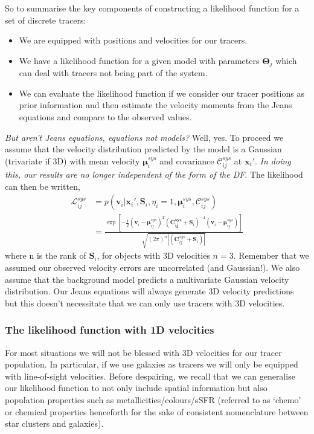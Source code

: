 So to summarise the key components of constructing a likelihood function for a set of discrete tracers: 
\begin{itemize}
    \item We are equipped with positions and velocities for our tracers.
    \item We have a likelihood function for a given model with parameters $\boldsymbol{\Theta}_{j}$ which can deal with tracers not being part of the system.
    \item We can evaluate the likelihood function if we consider our tracer positions as prior information and then estimate the velocity moments from the Jeans equations and compare to the observed values.
\end{itemize}
\textit{But aren't Jeans equations, equations not models?} Well, yes. To proceed we assume that the velocity distribution predicted by the model is a Gaussian (trivariate if 3D)  with mean velocity $\boldsymbol{\mu}_{i}^{sys}$ and covariance $\boldsymbol{\mathcal{C}}_{ij}^{sys}$ at $\boldsymbol{x}_i'$. \textit{In doing this, our results are no longer independent of the form of the DF}. The likelihood can then be written, 
\begin{align*}
\mathcal{L}_{ij}^{sys} &= p(\boldsymbol{v}_i|\boldsymbol{x}_{i}',\boldsymbol{S}_i,\eta_i=1,\boldsymbol{\mu}_{i}^{sys},\boldsymbol{\mathcal{C}}_{ij}^{sys}) \\ &= \frac{\exp{\left[-\frac{1}{2}(\boldsymbol{v}_i - \boldsymbol{\mu}_{ij}^{sys})^{T}(\boldsymbol{C_{ij}^{sys}} + \boldsymbol{S}_i)^{-1}(\boldsymbol{v}_i - \boldsymbol{\mu}_{ij}^{sys}) \right]}}{\sqrt{(2\pi)^{n}|(\boldsymbol{C}_{ij}^{sys}+\boldsymbol{S}_i)|}}
\end{align*}
where n is the rank of $\boldsymbol{S}_i$, for objects with 3D velocities $n=3$. Remember that we assumed our observed velocity errors are uncorrelated (and Gaussian!). We also assume that the background model predicts a multivariate Gaussian velocity distribution. Our Jeans equations will always generate 3D velocity predictions but this doesn't necessitate that we can only use tracers with 3D velocities. 

\subsubsection{The likelihood function with 1D velocities}
For most situations we will not be blessed with 3D velocities for our tracer population. In particular, if we use galaxies as tracers we will only be equipped with line-of-sight velocities. Before despairing, we recall that we can generalise our likelihood function to not only include spatial information but also population properties such as metallicities/colours/sSFR (referred to as `chemo' or chemical properties henceforth for the sake of consistent nomenclature between star clusters and galaxies). 

